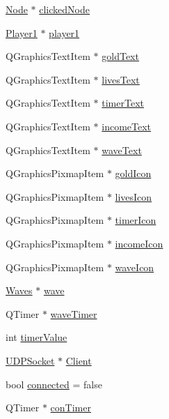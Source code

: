 \begin{DoxyCompactItemize}
\item 
\hyperlink{class_node}{Node} $\ast$ \hyperlink{class_game_a12f4bf2a7c8503c39b3102c4cc9dd40a}{clicked\+Node}
\item 
\hyperlink{class_player1}{Player1} $\ast$ \hyperlink{class_game_ad8a7cc146f99c7ec5b7c3c25d73f118c}{player1}
\item 
Q\+Graphics\+Text\+Item $\ast$ \hyperlink{class_game_a744c42428dc6293af83752027f9cbfde}{gold\+Text}
\item 
Q\+Graphics\+Text\+Item $\ast$ \hyperlink{class_game_ab83806346d49346a645bc850c51e331c}{lives\+Text}
\item 
Q\+Graphics\+Text\+Item $\ast$ \hyperlink{class_game_a21d038c2747c61d3b5a2a3d8f1764086}{timer\+Text}
\item 
Q\+Graphics\+Text\+Item $\ast$ \hyperlink{class_game_a7d139b0ba0ef2a94966b138d5e77a034}{income\+Text}
\item 
Q\+Graphics\+Text\+Item $\ast$ \hyperlink{class_game_ac33d078835536f2dc1af85ddbabd3a20}{wave\+Text}
\item 
Q\+Graphics\+Pixmap\+Item $\ast$ \hyperlink{class_game_a1ac5cae6ba58ec5fe157b138d6c41eac}{gold\+Icon}
\item 
Q\+Graphics\+Pixmap\+Item $\ast$ \hyperlink{class_game_acd6dae5d8f0c5670fa81433f5b329e0f}{lives\+Icon}
\item 
Q\+Graphics\+Pixmap\+Item $\ast$ \hyperlink{class_game_a5853a185c9981da12d5a6330c5f121c7}{timer\+Icon}
\item 
Q\+Graphics\+Pixmap\+Item $\ast$ \hyperlink{class_game_a54671774169c28677974ee423a147c39}{income\+Icon}
\item 
Q\+Graphics\+Pixmap\+Item $\ast$ \hyperlink{class_game_ade75481ee579a63670f6d7358919634a}{wave\+Icon}
\item 
\hyperlink{class_waves}{Waves} $\ast$ \hyperlink{class_game_af9a4b49ad573785e961b29758c84fdd0}{wave}
\item 
Q\+Timer $\ast$ \hyperlink{class_game_a06a7795cf068aa5cc3b1debbea3f82ef}{wave\+Timer}
\item 
int \hyperlink{class_game_aef6faf2c7e350578fea82f340353fa6b}{timer\+Value}
\item 
\hyperlink{class_u_d_p_socket}{U\+D\+P\+Socket} $\ast$ \hyperlink{class_game_aa7fd8508fad68c550129f2be61c37467}{Client}
\item 
bool \hyperlink{class_game_aec6408b42da34f430bffb649653de96b}{connected} = false
\item 
Q\+Timer $\ast$ \hyperlink{class_game_a266d51c575b09c22aac86e20487802f4}{con\+Timer}

\end{DoxyCompactItemize}
